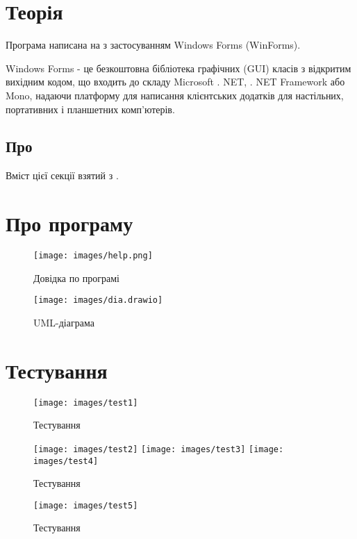 \section{Теорія}
Програма написана на  з застосуванням Windows Forms (WinForms).

Windows Forms - це безкоштовна бібліотека графічних (GUI) класів з
відкритим вихідним кодом, що входить до складу Microsoft . NET, . NET Framework
або Mono, надаючи платформу для написання клієнтських додатків для настільних,
портативних і планшетних комп'ютерів.
\subsection{Про }
Вміст цієї секції взятий з \cite{mslearn}.
\begin{description}
	\item[\code{}]
\end{description}

\section{Про програму}
\begin{figure}[H]
	\centering
	\texttt{[image: images/help.png]}
	\caption{Довідка по програмі}
	\label{fig:help}
\end{figure}
\begin{figure}[H]
	\centering
	\texttt{[image: images/dia.drawio]}
	\caption{UML-діаграма}
	\label{fig:tag}
\end{figure}

\section{Тестування}
\begin{figure}[H]
	\centering
	\texttt{[image: images/test1]}
	\caption{Тестування}
	\label{fig:tag}
\end{figure}
\begin{figure}[H]
	\ContinuedFloat\centering
	\texttt{[image: images/test2]}
	\texttt{[image: images/test3]}
	\texttt{[image: images/test4]}
	\caption{Тестування}
	\label{fig:tag}
\end{figure}

\begin{figure}[H]
	\ContinuedFloat\centering
	\texttt{[image: images/test5]}
	\caption{Тестування}
	\label{fig:tag}
\end{figure}


